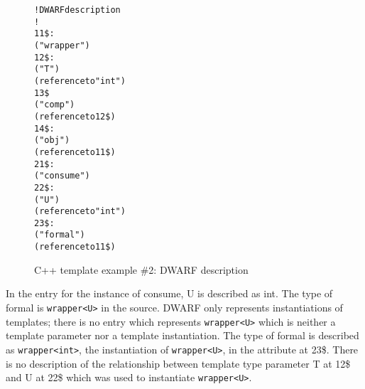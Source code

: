 \begin{figure}[h]
\begin{dwflisting}
\begin{alltt}
! DWARF description
!
11\$: 
        ("wrapper")
12\$:   
            ("T")
            (reference to "int")
13\$    
            ("comp")
            (reference to 12\$)
14\$: 
        ("obj")
        (reference to 11\$)
21\$: 
        ("consume")
22\$:   
            ("U")
            (reference to "int")
23\$:   
            ("formal")
            (reference to 11\$)
\end{alltt}
\end{dwflisting}
\caption{C++ template example \#2: DWARF description}
\label{fig:ctemplateexample2dwarf}
\end{figure}

In the  
entry for the instance of consume, U is described as int. 
The type of formal is \texttt{wrapper\textless U\textgreater} in
the source. DWARF only represents instantiations of templates;
there is no entry which represents \texttt{wrapper\textless U\textgreater} 
which is neither
a template parameter nor a template instantiation. The type
of formal is described as \texttt{wrapper\textless int\textgreater},
the instantiation of \texttt{wrapper\textless U\textgreater},
in the  attribute at 
23\$. 
There is no
description of the relationship between template type parameter
T at 12\$ and U at 22\$ which was used to instantiate
\texttt{wrapper\textless U\textgreater}.

